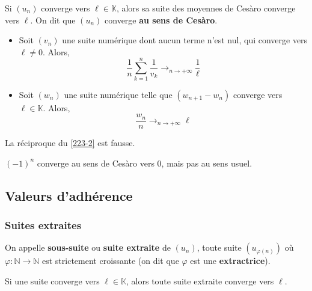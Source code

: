   \begin{theorem}
    \label{223-2}
    Si $(u_n)$ converge vers $\ell \in \mathbb{K}$, alors sa suite des moyennes de Cesàro converge vers $\ell$. On dit que $(u_n)$ converge \textbf{au sens de Cesàro}.
  \end{theorem}

  \begin{example}
    \begin{itemize}
      \item Soit $(v_n)$ une suite numérique dont aucun terme n'est nul, qui converge vers $\ell \neq 0$. Alors,
      \[ \frac{1}{n} \sum_{k=1}^n \frac{1}{v_k} \longrightarrow_{n \rightarrow +\infty} \frac{1}{\ell} \]
      \item Soit $(w_n)$ une suite numérique telle que $(w_{n+1} - w_n)$ converge vers $\ell \in \mathbb{K}$. Alors,
      \[ \frac{w_n}{n} \longrightarrow_{n \rightarrow +\infty} \ell \]
    \end{itemize}
  \end{example}

  \begin{remark}
    La réciproque du \cref{223-2} est fausse.
  \end{remark}

  \begin{example}
    $(-1)^n$ converge au sens de Cesàro vers $0$, mais pas au sens usuel.
  \end{example}

  \subsection{Valeurs d'adhérence}

  \subsubsection{Suites extraites}


  \begin{definition}
    On appelle \textbf{sous-suite} ou \textbf{suite extraite} de $(u_n)$, toute suite $(u_{\varphi(n)})$ où $\varphi : \mathbb{N} \rightarrow \mathbb{N}$ est strictement croissante (on dit que $\varphi$ est une \textbf{extractrice}).
  \end{definition}

  \begin{proposition}
    Si une suite converge vers $\ell \in \mathbb{K}$, alors toute suite extraite converge vers $\ell$.
  \end{proposition}


